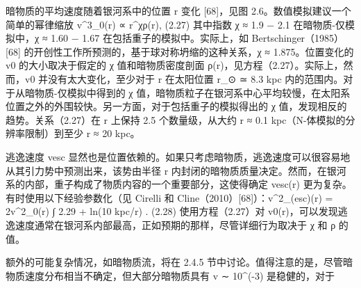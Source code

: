 暗物质的平均速度随着银河系中的位置 r 变化 [68]，见图 2.6。数值模拟建议一个简单的幂律缩放
v^3_0(r) ∝ r^χρ(r), (2.27)
其中指数 χ ≈ 1.9 − 2.1 在暗物质-仅模拟中，χ ≈ 1.60 − 1.67 在包括重子的模拟中。实际上，如 Bertschinger（1985）[68] 的开创性工作所预测的，基于球对称坍缩的这种关系，χ ≈ 1.875。位置变化的 v0 的大小取决于假定的 χ 值和暗物质密度剖面 ρ(r)，见方程（2.27）。实际上，然而，v0 并没有太大变化，至少对于 r 在太阳位置 r_⊙ ≃ 8.3 kpc 内的范围内。对于从暗物质-仅模拟中得到的 χ 值，暗物质粒子在银河系中心平均较慢，在太阳系位置之外的外围较快。另一方面，对于包括重子的模拟得出的 χ 值，发现相反的趋势。关系（2.27）在 r 上保持 2.5 个数量级，从大约 r ≈ 0.1 kpc（N-体模拟的分辨率限制）到至少 r ≈ 20 kpc。

逃逸速度 vesc 显然也是位置依赖的。如果只考虑暗物质，逃逸速度可以很容易地从其引力势中预测出来，该势由半径 r 内封闭的暗物质质量决定。然而，在银河系的内部，重子构成了物质内容的一个重要部分，这使得确定 vesc(r) 更为复杂。有时使用以下经验参数化（见 Cirelli 和 Cline（2010）[68]）：v^2_(esc)(r) = 2v^2_0(r) ∫ 2.29 + ln(10 kpc/r) . (2.28)
使用方程（2.27）对 v0(r)，可以发现逃逸速度通常在银河系内部最高，正如预期的那样，尽管详细行为取决于 χ 和 ρ 的值。

额外的可能复杂情况，如暗物质流，将在 2.4.5 节中讨论。值得注意的是，尽管暗物质速度分布相当不确定，但大部分暗物质具有 v ∼ 10^(-3) 是稳健的，对于 

